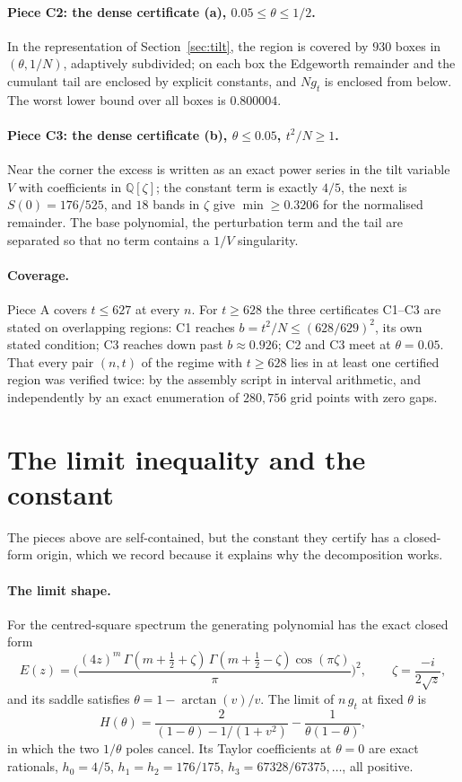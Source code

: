 \documentclass[12pt]{article}
\newcommand{\Qq}{\mathbb{Q}}
\begin{document}
\paragraph{Piece C2: the dense certificate (a), $0.05\le\theta\le1/2$.}
In the representation of Section~\ref{sec:tilt}, the region is covered by $930$ boxes in $(\theta, 1/N)$, adaptively subdivided; on each box the Edgeworth remainder and the cumulant tail are enclosed by explicit constants, and $N g_t$ is enclosed from below. The worst lower bound over all boxes is $0.800004$.

\paragraph{Piece C3: the dense certificate (b), $\theta\le0.05$, $t^2/N\ge1$.}
Near the corner the excess is written as an exact power series in the tilt variable $V$ with coefficients in $\Qq[\zeta]$; the constant term is exactly $4/5$, the next is $S(0) = 176/525$, and $18$ bands in $\zeta$ give $\min \ge 0.3206$ for the normalised remainder. The base polynomial, the perturbation term and the tail are separated so that no term contains a $1/V$ singularity.

\paragraph{Coverage.}
Piece A covers $t\le 627$ at every $n$. For $t\ge 628$ the three certificates C1--C3 are stated on overlapping regions: C1 reaches $b = t^2/N \le (628/629)^2$, its own stated condition; C3 reaches down past $b \approx 0.926$; C2 and C3 meet at $\theta = 0.05$. That every pair $(n,t)$ of the regime with $t \ge 628$ lies in at least one certified region was verified twice: by the assembly script in interval arithmetic, and independently by an exact enumeration of $280{,}756$ grid points with zero gaps.

\section{The limit inequality and the constant}\label{sec:limit}

The pieces above are self-contained, but the constant they certify has a closed-form origin, which we record because it explains why the decomposition works.

\paragraph{The limit shape.}
For the centred-square spectrum the generating polynomial has the exact closed form
\[
E(z) = \Big( \frac{(4z)^m\,\Gamma(m+\tfrac12+\zeta)\,\Gamma(m+\tfrac12-\zeta)\cos(\pi\zeta)}{\pi} \Big)^2, \qquad \zeta = \frac{-i}{2\sqrt z},
\]
and its saddle satisfies $\theta = 1 - \arctan(v)/v$. The limit of $n\,g_t$ at fixed $\theta$ is
\begin{equation}\label{eq:Htheta}
H(\theta) = \frac{2}{(1-\theta) - 1/(1+v^2)} - \frac{1}{\theta(1-\theta)},
\end{equation}
in which the two $1/\theta$ poles cancel. Its Taylor coefficients at $\theta=0$ are exact rationals, $h_0 = 4/5$, $h_1 = h_2 = 176/175$, $h_3 = 67328/67375, \dots$, all positive.
\end{document}
